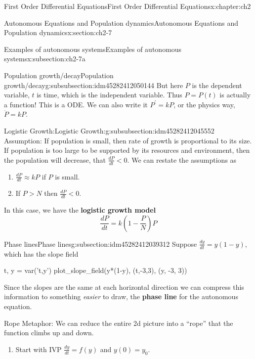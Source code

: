 \documentclass[oneside,10pt,]{book}
\newcommand{\terminology}[1]{\textbf{#1}}
\numberwithin{equation}{section}
\numberwithin{equation}{section}
\newcommand{\lt}{<}
\begin{document}
\begin{chapterptx}{First Order Differential Equations}{}{First Order Differential Equations}{}{}{x:chapter:ch2}
\begin{sectionptx}{Autonomous Equations and Population dynamics}{}{Autonomous Equations and Population dynamics}{}{}{x:section:ch2-7}
\begin{subsectionptx}{Examples of autonomous systems}{}{Examples of autonomous systems}{}{}{x:subsection:ch2-7a}
\begin{subsubsectionptx}{Population growth\slash{}decay}{}{Population growth\slash{}decay}{}{}{g:subsubsection:idm45282412050144}
But here \(P\) is the dependent variable, \(t\) is time, which is the independent variable. Thus \(P=P(t)\) is actually a function! This is a ODE. We can also write it \(P^{\prime}=kP\), or the physics way, \(\dot{P}=kP\).%
\end{subsubsectionptx}
%
%
\typeout{************************************************}
\typeout{************************************************}
%
\begin{subsubsectionptx}{Logistic Growth:}{}{Logistic Growth:}{}{}{g:subsubsection:idm45282412045552}
Assumption: If population is small, then rate of growth is proportional to its size. If population is too large to be supported by its resources and environment, then the population will decrease, that \(\frac{dP}{dt} \lt 0\). We can restate the assumptions as%
\begin{enumerate}
\item{}\(\frac{dP}{dt}\approx kP\) if \(P\) is small.%
\item{}If \(P>N\) then \(\frac{dP}{dt} \lt 0\).%
\end{enumerate}
%
\par
In this case, we have the \terminology{logistic growth model}%
\begin{equation*}
\frac{dP}{dt}=k\left(1-\frac{P}{N}\right)P
\end{equation*}
%
\end{subsubsectionptx}
\end{subsectionptx}
%
%
\typeout{************************************************}
\typeout{************************************************}
%
\begin{subsectionptx}{Phase lines}{}{Phase lines}{}{}{g:subsection:idm45282412039312}
Suppose \(\frac{dy}{dt}=y(1-y)\), which has the slope field \begin{sageinput}
t, y = var('t,y')
plot_slope_field(y*(1-y), (t,-3,3), (y, -3, 3))
\end{sageinput}
%
\par
Since the slopes are the same at each horizontal direction we can compress this information to something \emph{easier} to draw, the \terminology{phase line} for the autonomous equation.%
\par
Rope Metaphor: We can reduce the entire 2d picture into a ``rope'' that the function climbs up and down.%
\begin{enumerate}
\item{}Start with IVP \(\frac{dy}{dt}=f(y)\) and \(y(0)=y_{0}\).%

\end{enumerate}
\end{subsectionptx}
\end{sectionptx}
\end{chapterptx}
\end{document}
